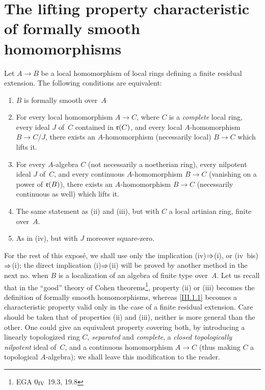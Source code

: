 \section[The lifting property]{The lifting property characteristic of formally smooth homomorphisms}
\label{III.2}

\begin{theorem}
\label{III.2.1}
Let $A \to B$ be a local homomorphism of local rings defining a finite residual extension. The following conditions are equivalent:
\begin{enumerate}
\item[(i)]
$B$ is formally smooth over~$A$
\item[(ii)] For every local homomorphism $A \to C$, where $C$ is a
\emph{complete} local ring, every ideal $J$ of~$C$ contained in
$\mathfrak{r}(C)$, and every local $A$-homomorphism $B \to C/J$, there
exists an $A$-homomorphism (necessarily local) $B \to C$ which
lifts it.
\item[(iii)] For every $A$-algebra $C$ (not necessarily a
noetherian ring), every nilpotent ideal $J$ of~$C$, and every
continuous $A$-homomorphism $B \to C$ (\ie vanishing on a power of
$\mathfrak{r}(B)$), there exists an $A$-homomorphism $B \to C$
(necessarily continuous as well) which lifts it.
\item[(iv)] The same statement as \textup{(ii)} and \textup{(iii)}, but with $C$
a local artinian ring, finite over~$A$.
\item[(iv~bis)] As in \textup{(iv)}, but with $J$ moreover square-zero.
\end{enumerate}
\end{theorem}

\begin{remarkstar}
For the rest of this exposé, we shall use only the implication
(iv)$\To$(i), or (iv~bis)$\To$(i); the direct implication
(i)$\To$(ii) will be proved by another method in the next no. when
$B$ is a localization of an algebra of finite type over~$A$. Let us
recall that in the ``good'' theory of Cohen theorems\footnote{\Cf EGA
$0_{\textup{IV}}$ 19.3, 19.8}, property (ii) or (iii) becomes the
definition of formally smooth homomorphisms, whereas \ref{III.1.1}
becomes a characteristic property valid only in the case of a finite
residual extension. Care should be taken that of properties (ii) and
(iii), neither is more general than the other. One could give an
equivalent property covering both, by introducing a linearly
topologized ring $C$, \emph{separated} and \emph{complete}, a
\emph{closed topologically nilpotent} ideal of~$C$, and a continuous
homomorphism $A \to C$ (thus making $C$ a topological $A$-algebra);
we shall leave this modification to the reader.
\end{remarkstar}

